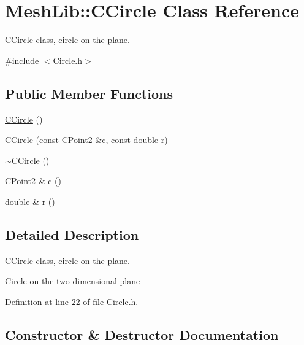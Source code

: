 \hypertarget{class_mesh_lib_1_1_c_circle}{}\section{Mesh\+Lib\+:\+:C\+Circle Class Reference}
\label{class_mesh_lib_1_1_c_circle}


\hyperlink{class_mesh_lib_1_1_c_circle}{C\+Circle} class, circle on the plane.  




{\ttfamily \#include $<$Circle.\+h$>$}

\subsection*{Public Member Functions}
\begin{DoxyCompactItemize}
\item 
\hyperlink{class_mesh_lib_1_1_c_circle_ac93a47d827130cb3c3cb25724f19685f}{C\+Circle} ()
\item 
\hyperlink{class_mesh_lib_1_1_c_circle_a228003f30ff009cdd5b086cc71c7527f}{C\+Circle} (const \hyperlink{class_mesh_lib_1_1_c_point2}{C\+Point2} \&\hyperlink{class_mesh_lib_1_1_c_circle_ab3fae322fad5402d3f9df36d20d3416d}{c}, const double \hyperlink{class_mesh_lib_1_1_c_circle_a0f097b93f99ce4f540bc2e0351751932}{r})
\item 
\hyperlink{class_mesh_lib_1_1_c_circle_ab5c4fca3b7a12c0c9891762ae898ece3}{$\sim$\+C\+Circle} ()
\item 
\hyperlink{class_mesh_lib_1_1_c_point2}{C\+Point2} \& \hyperlink{class_mesh_lib_1_1_c_circle_ab3fae322fad5402d3f9df36d20d3416d}{c} ()
\item 
double \& \hyperlink{class_mesh_lib_1_1_c_circle_a0f097b93f99ce4f540bc2e0351751932}{r} ()
\end{DoxyCompactItemize}


\subsection{Detailed Description}
\hyperlink{class_mesh_lib_1_1_c_circle}{C\+Circle} class, circle on the plane. 

Circle on the two dimensional plane 

Definition at line 22 of file Circle.\+h.



\subsection{Constructor \& Destructor Documentation}
